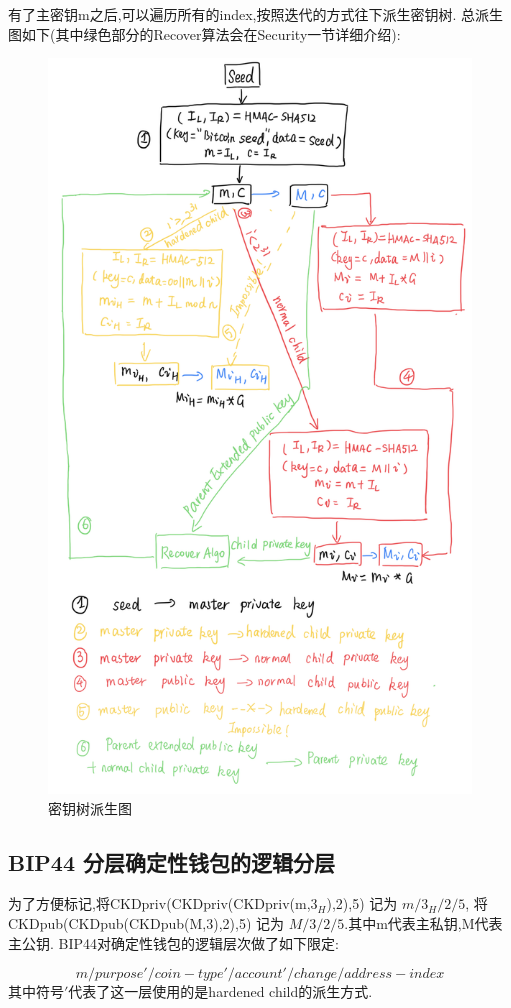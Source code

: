 有了主密钥m之后,可以遍历所有的index,按照迭代的方式往下派生密钥树.
总派生图如下(其中绿色部分的Recover算法会在Security一节详细介绍):

\begin{figure}[h]
\centering
\includegraphics[width=.8\textwidth]{./outline.png}
\caption{密钥树派生图}\label{fig-parsesig}
\end{figure}

\subsection{BIP44 分层确定性钱包的逻辑分层}

为了方便标记,将CKDpriv(CKDpriv(CKDpriv(m,$3_H$),2),5) 记为 $m/3_H/2/5$,
将CKDpub(CKDpub(CKDpub(M,3),2),5) 记为 $M/3/2/5$.其中m代表主私钥,M代表主公钥.
BIP44对确定性钱包的逻辑层次做了如下限定:

$$m / purpose' / coin-type' / account' / change / address-index$$
其中符号$'$代表了这一层使用的是hardened child的派生方式.

